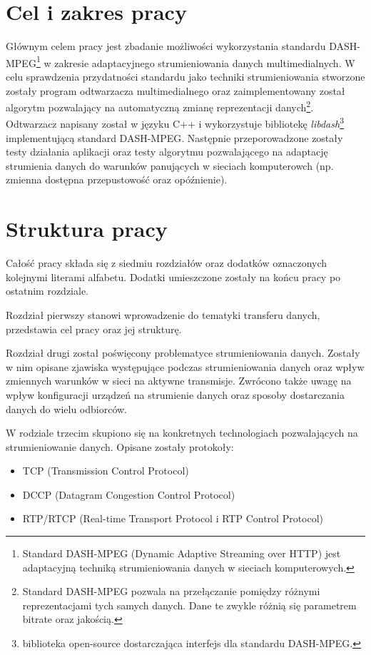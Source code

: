 \section{Cel i zakres pracy}

Głównym celem pracy jest zbadanie możliwości wykorzystania standardu DASH-MPEG\footnote{Standard DASH-MPEG (Dynamic Adaptive Streaming over HTTP) jest adaptacyjną techniką strumieniowania danych w sieciach komputerowych.} w zakresie adaptacyjnego strumieniowania danych multimedialnych. W celu sprawdzenia przydatności standardu jako techniki strumieniowania stworzone zostały program odtwarzacza multimedialnego oraz zaimplementowany został algorytm pozwalający na automatyczną zmianę reprezentacji danych\footnote{Standard DASH-MPEG pozwala na przełączanie pomiędzy różnymi reprezentacjami tych samych danych. Dane te zwykle różnią się parametrem bitrate oraz jakością.}. Odtwarzacz napisany został w języku C++ i wykorzystuje bibliotekę \textit{libdash}\footnote{biblioteka open-source dostarczająca interfejs dla standardu DASH-MPEG.} implementującą standard DASH-MPEG. Następnie przeporowadzone zostały testy działania aplikacji oraz testy algorytmu pozwalającego na adaptację strumienia danych do warunków panujących w sieciach komputerowch (np. zmienna dostępna przepustowość oraz opóźnienie).

\section{Struktura pracy}

Całość pracy składa się z siedmiu rozdziałów oraz dodatków oznaczonych kolejnymi literami alfabetu. Dodatki umieszczone zostały na końcu pracy po ostatnim rozdziale.

Rozdział pierwszy stanowi wprowadzenie do tematyki transferu danych, przedstawia cel pracy oraz jej strukturę.

Rozdział drugi został poświęcony problematyce strumieniowania danych. Zostały w nim opisane zjawiska występujące podczas strumieniowania danych oraz wpływ zmiennych warunków w sieci na aktywne transmisje. Zwrócono także uwagę na wpływ konfiguracji urządzeń na strumienie danych oraz sposoby dostarczania danych do wielu odbiorców. 

W rodziale trzecim skupiono się na konkretnych technologiach pozwalających na strumieniowanie danych. Opisane zostały protokoły:
\begin{itemize}
\item TCP (Transmission Control Protocol)
\item DCCP (Datagram Congestion Control Protocol)
\item RTP/RTCP (Real-time Transport Protocol i RTP Control Protocol)
\end{itemize}

